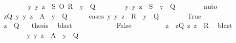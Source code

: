 \begin{isabellebody}
\ \ \ \ \ \ \ {}{\isacharcolon}{\kern0pt}\ {\isachardoublequoteopen}{\isasymAnd}y{\isachardot}{\kern0pt}\ {\isacharparenleft}{\kern0pt}y{\isacharcomma}{\kern0pt}\ z{\isacharparenright}{\kern0pt}\ {\isasymin}\ S\ O\ R\ {\isasymLongrightarrow}\ y\ {\isasymnotin}\ Q{\isachardoublequoteclose}\isanewline
\ \ \ \ \ \ \ {}{\isacharcolon}{\kern0pt}\ {\isachardoublequoteopen}{\isasymAnd}y{\isachardot}{\kern0pt}\ {\isacharparenleft}{\kern0pt}y{\isacharcomma}{\kern0pt}\ z{\isacharparenright}{\kern0pt}\ {\isasymin}\ S\ {\isasymLongrightarrow}\ y\ {\isasymnotin}\ Q{\isachardoublequoteclose}\isanewline
\ \ \ \ \ \ \isamarkupfalse%
\ auto\isanewline
\ \ \ \ \isamarkupfalse%
\ {\isachardoublequoteopen}{\isasymexists}z{\isasymin}Q{\isachardot}{\kern0pt}\ {\isasymforall}y{\isachardot}{\kern0pt}\ {\isacharparenleft}{\kern0pt}y{\isacharcomma}{\kern0pt}\ z{\isacharparenright}{\kern0pt}\ {\isasymin}\ {\isacharquery}{\kern0pt}A\ {\isasymlongrightarrow}\ y\ {\isasymnotin}\ Q{\isachardoublequoteclose}\isanewline
\ \ \ \ \isamarkupfalse%
\ {\isacharparenleft}{\kern0pt}cases\ {\isachardoublequoteopen}{\isasymforall}y{\isachardot}{\kern0pt}\ {\isacharparenleft}{\kern0pt}y{\isacharcomma}{\kern0pt}\ z{\isacharparenright}{\kern0pt}\ {\isasymin}\ R\ {\isasymlongrightarrow}\ y\ {\isasymnotin}\ Q{\isachardoublequoteclose}{\isacharparenright}{\kern0pt}\isanewline
\ \ \ \ \ \ \isamarkupfalse%
\ True\isanewline
\ \ \ \ \ \ \isamarkupfalse%
\ {\isacartoucheopen}z\ {\isasymin}\ Q{\isacartoucheclose}\ {}\ \isamarkupfalse%
\ {\isacharquery}{\kern0pt}thesis\ \isamarkupfalse%
\ blast\isanewline
\ \ \ \ \isamarkupfalse%
\isanewline
\ \ \ \ \ \ \isamarkupfalse%
\ False\isanewline
\ \ \ \ \ \ \isamarkupfalse%
\ \isamarkupfalse%
\ z{\isacharprime}{\kern0pt}\ \ {\isachardoublequoteopen}z{\isacharprime}{\kern0pt}{\isasymin}Q{\isachardoublequoteclose}\ {\isachardoublequoteopen}{\isacharparenleft}{\kern0pt}z{\isacharprime}{\kern0pt}{\isacharcomma}{\kern0pt}\ z{\isacharparenright}{\kern0pt}\ {\isasymin}\ R{\isachardoublequoteclose}\ \isamarkupfalse%
\ blast\isanewline
\ \ \ \ \ \ \isamarkupfalse%
\ {\isachardoublequoteopen}{\isasymforall}y{\isachardot}{\kern0pt}\ {\isacharparenleft}{\kern0pt}y{\isacharcomma}{\kern0pt}\ z{\isacharprime}{\kern0pt}{\isacharparenright}{\kern0pt}\ {\isasymin}\ {\isacharquery}{\kern0pt}A\ {\isasymlongrightarrow}\ y\ {\isasymnotin}\ Q{\isachardoublequoteclose}\isanewline

\end{isabellebody}
